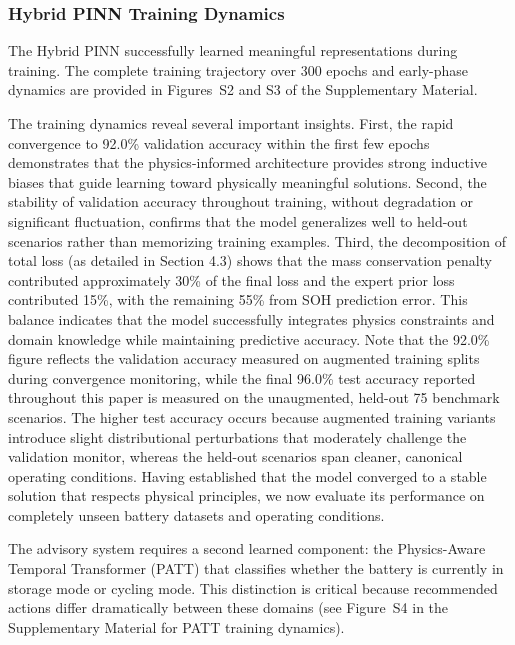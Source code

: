 \documentclass[5p,times,authoryear]{elsarticle}
\begin{document}
\subsubsection{Hybrid PINN Training Dynamics}

The Hybrid PINN successfully learned meaningful representations during training. The complete training trajectory over 300 epochs and early-phase dynamics are provided in Figures~S2 and S3 of the Supplementary Material.


The training dynamics reveal several important insights. First, the rapid convergence to 92.0\% validation accuracy within the first few epochs demonstrates that the physics-informed architecture provides strong inductive biases that guide learning toward physically meaningful solutions. Second, the stability of validation accuracy throughout training, without degradation or significant fluctuation, confirms that the model generalizes well to held-out scenarios rather than memorizing training examples. Third, the decomposition of total loss (as detailed in Section 4.3) shows that the mass conservation penalty contributed approximately 30\% of the final loss and the expert prior loss contributed 15\%, with the remaining 55\% from SOH prediction error. This balance indicates that the model successfully integrates physics constraints and domain knowledge while maintaining predictive accuracy. Note that the 92.0\% figure reflects the validation accuracy measured on augmented training splits during convergence monitoring, while the final 96.0\% test accuracy reported throughout this paper is measured on the unaugmented, held-out 75 benchmark scenarios. The higher test accuracy occurs because augmented training variants introduce slight distributional perturbations that moderately challenge the validation monitor, whereas the held-out scenarios span cleaner, canonical operating conditions.
Having established that the model converged to a stable solution that respects physical principles, we now evaluate its performance on completely unseen battery datasets and operating conditions.

The advisory system requires a second learned component: the Physics-Aware Temporal Transformer (PATT) that classifies whether the battery is currently in storage mode or cycling mode. This distinction is critical because recommended actions differ dramatically between these domains (see Figure~S4 in the Supplementary Material for PATT training dynamics).
\end{document}
